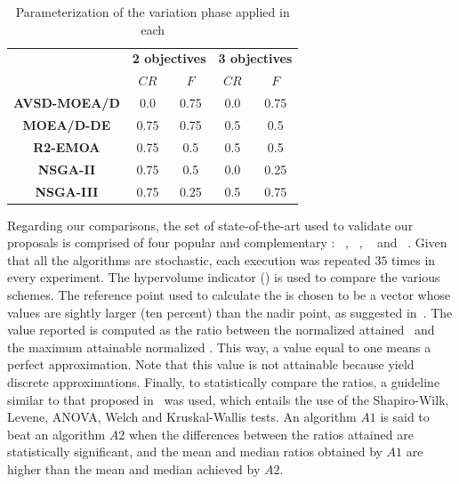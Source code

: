 \begin{table}[t]
\centering
\caption{Parameterization of the variation phase applied in each \MOEA{}}
\label{tab:tunning}
\begin{scriptsize}
\begin{tabular}{c|c|c|c|c}
\hline
\multirow{2}{*}{} &\multicolumn{2}{c|}{ \textbf{2 objectives} }& \multicolumn{2}{c}{\textbf{3 objectives} }\\ \cline{2-5} 
 & $CR$ & $F$ & $CR$ & $F$ \\ \hline
\textbf{AVSD-MOEA/D} & 0.0 & 0.75 & 0.0 & 0.75 \\ \hline
\textbf{MOEA/D-DE} & 0.75 & 0.75 & 0.5 & 0.5 \\ \hline
\textbf{R2-EMOA} & 0.75 & 0.5 & 0.5 & 0.5 \\ \hline
\textbf{NSGA-II} & 0.75 & 0.5 & 0.0 & 0.25 \\ \hline
\textbf{NSGA-III} & 0.75 & 0.25 & 0.5 & 0.75 \\ \hline
\end{tabular}%
\end{scriptsize}
\end{table}

Regarding our comparisons, the set of state-of-the-art \MOEAS{} used to validate our proposals is comprised of four 
popular and complementary \MOEAS{}: \NSGAII{}~\cite{deb2002fast}, \MOEADDE{}~\cite{zhang2009performance}, \RMOEA{}~\cite{trautmann2013r2} 
and \NSGAIII{}~\cite{deb2013evolutionary}.
%
Given that all the algorithms are stochastic, each execution was repeated $35$ times in every experiment.
%
The hypervolume indicator (\HV{}) is used to compare the various schemes.
%
The reference point used to calculate the \HV{} is chosen to be a vector whose values are sightly larger (ten percent) 
than the nadir point, as suggested in~\cite{ishibuchi2017reference}.
%
The value reported is computed as the ratio between the normalized \HV{} attained~\cite{li2014evolutionary} 
and the maximum attainable normalized \HV{}.
%
This way, a value equal to one means a perfect approximation.
%
Note that this value is not attainable because \MOEAS{} yield discrete approximations.
%
Finally, to statistically compare the \HV{} ratios, a guideline similar to that proposed in~\cite{durillo2010study} was used, 
which entails the use of the Shapiro-Wilk, Levene, ANOVA, Welch and Kruskal-Wallis tests.
%
An algorithm $A1$ is said to beat an algorithm $A2$ when the differences between the \HV{} ratios attained are statistically significant, 
and the mean and median \HV{} ratios obtained by $A1$ are higher than the mean and median achieved by $A2$.



